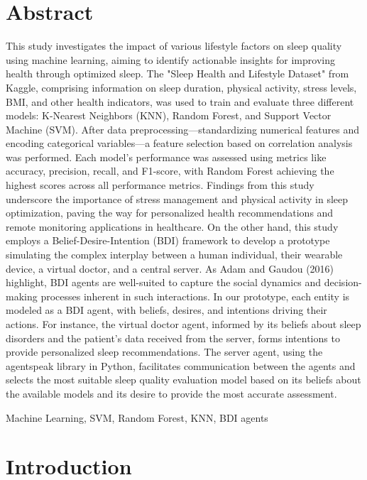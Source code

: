 \documentclass[conference]{IEEEtran}
\begin{document}
\section{Abstract}
This study investigates the impact of various lifestyle factors on sleep quality using machine learning, aiming to identify actionable insights for improving health through optimized sleep. The "Sleep Health and Lifestyle Dataset" from Kaggle, comprising information on sleep duration, physical activity, stress levels, BMI, and other health indicators, was used to train and evaluate three different models: K-Nearest Neighbors (KNN), Random Forest, and Support Vector Machine (SVM). After data preprocessing—standardizing numerical features and encoding categorical variables—a feature selection based on correlation analysis was performed. Each model's performance was assessed using metrics like accuracy, precision, recall, and F1-score, with Random Forest achieving the highest scores across all performance metrics. Findings from this study underscore the importance of stress management and physical activity in sleep optimization, paving the way for personalized health recommendations and remote monitoring applications in healthcare. On the other hand, this study employs a Belief-Desire-Intention (BDI) framework to develop a prototype simulating the complex interplay between a human individual, their wearable device, a virtual doctor, and a central server. As Adam and Gaudou (2016) \cite{adam2016bdi} highlight, BDI agents are well-suited to capture the social dynamics and decision-making processes inherent in such interactions. In our prototype, each entity is modeled as a BDI agent, with beliefs, desires, and intentions driving their actions. For instance, the virtual doctor agent, informed by its beliefs about sleep disorders and the patient's data received from the server, forms intentions to provide personalized sleep recommendations. The server agent, using the agentspeak library in Python, facilitates communication between the agents and selects the most suitable sleep quality evaluation model based on its beliefs about the available models and its desire to provide the most accurate assessment.  


\begin{IEEEkeywords}
Machine Learning, SVM, Random Forest, KNN, BDI agents
\end{IEEEkeywords}

\section{Introduction}
\end{document}
